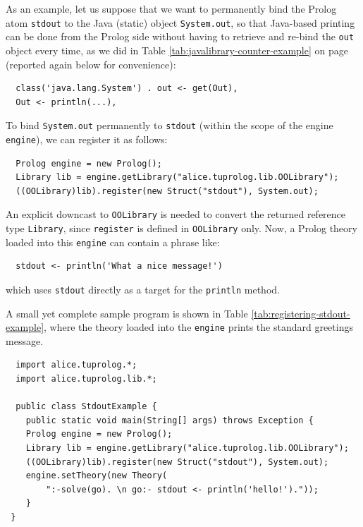 As an example, let us suppose that we want to permanently bind the Prolog atom \texttt{stdout} to the Java (static) object \texttt{System.out}, so that Java-based printing can be done from the Prolog side without having to retrieve and re-bind the \texttt{out} object every time, as we did in Table \ref{tab:javalibrary-counter-example} on page \pageref{tab:javalibrary-counter-example} (reported again below for convenience):

\begin{verbatim}
  class('java.lang.System') . out <- get(Out),
  Out <- println(...),
\end{verbatim}

\noindent To bind \texttt{System.out} permanently to \texttt{stdout} (within the scope of the \tuprolog{} engine \texttt{engine}), we can register it as follows:

{\small
\begin{verbatim}
  Prolog engine = new Prolog();
  Library lib = engine.getLibrary("alice.tuprolog.lib.OOLibrary");
  ((OOLibrary)lib).register(new Struct("stdout"), System.out);
\end{verbatim}}

\noindent An explicit downcast to \texttt{OOLibrary} is needed to convert the returned reference type \texttt{Library}, since \texttt{register} is defined in \texttt{OOLibrary} only.
%
Now, a Prolog theory loaded into this \texttt{engine} can contain a phrase like:
%
\begin{verbatim}
  stdout <- println('What a nice message!')
\end{verbatim}
%
which uses \texttt{stdout} directly as a target for the \texttt{println} method.

A small yet complete sample program is shown in Table \ref{tab:registering-stdout-example}, where the theory loaded into the \texttt{engine} prints the standard greetings message.

\begin{table}[h]
{\small
\begin{verbatim}
  import alice.tuprolog.*;
  import alice.tuprolog.lib.*;

  public class StdoutExample {
    public static void main(String[] args) throws Exception {
    Prolog engine = new Prolog();
    Library lib = engine.getLibrary("alice.tuprolog.lib.OOLibrary");
    ((OOLibrary)lib).register(new Struct("stdout"), System.out);
    engine.setTheory(new Theory(
        ":-solve(go). \n go:- stdout <- println('hello!')."));
    }
 }
\end{verbatim}}
\caption{A program registering \texttt{stdout} for \texttt{System.out}. As an alternative to \texttt{getLibrary}, \texttt{loadLibrary} could have been used---if the library is already loaded, its behavior is identical to \texttt{getLibrary}'s.
%
Also, the fully qualified class name \texttt{"alice.tuprolog.lib.OOLibrary"} is needed in \texttt{getLibrary} only because \texttt{OOLibrary} does \textit{not} define a short library name (see Section \ref{ssec:library-name} for details): otherwise, the shorter name could have been used.}
\label{tab:registering-stdout-example}
\end{table}

